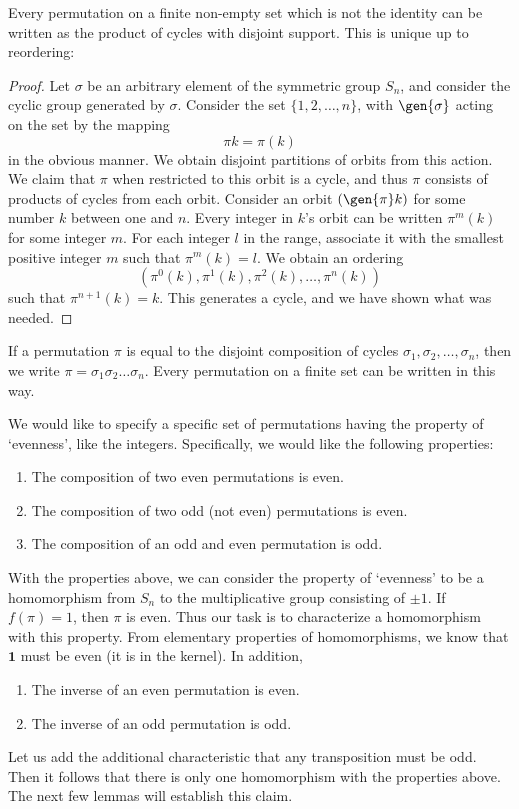 \begin{theorem}
Every permutation on a finite non-empty set which is not the identity can be written as the product of cycles with disjoint support. This is unique up to reordering:
\end{theorem}
\begin{proof}
    Let $\sigma$ be an arbitrary element of the symmetric group $S_n$, and consider the cyclic group generated by $\sigma$. Consider the set $\{ 1, 2, \dots, n \}$, with $\gen{\sigma}$ acting on the set by the mapping
    \[ \pi k = \pi(k) \]
    in the obvious manner. We obtain disjoint partitions of orbits from this action. We claim that $\pi$ when restricted to this orbit is a cycle, and thus $\pi$ consists of products of cycles from each orbit. Consider an orbit $(\gen{\pi} k)$ for some number $k$ between one and $n$. Every integer in $k$'s orbit can be written $\pi^m(k)$ for some integer $m$. For each integer $l$ in the range, associate it with the smallest positive integer $m$ such that $\pi^m(k) = l$. We obtain an ordering
    \[ (\pi^0(k), \pi^1(k), \pi^2(k), \dots, \pi^n(k)) \]
    such that $\pi^{n+1}(k) = k$. This generates a cycle, and we have shown what was needed.
\end{proof}

If a permutation $\pi$ is equal to the disjoint composition of cycles $\sigma_1, \sigma_2, \dots, \sigma_n$, then we write $\pi = \sigma_1\sigma_2\dots\sigma_n$. Every permutation on a finite set can be written in this way.

We would like to specify a specific set of permutations having the property of `evenness', like the integers. Specifically, we would like the following properties:
%
\begin{enumerate}
    \item The composition of two even permutations is even.
    \item The composition of two odd (not even) permutations is even.
    \item The composition of an odd and even permutation is odd.
\end{enumerate}
%
With the properties above, we can consider the property of `evenness' to be a homomorphism from $S_n$ to the multiplicative group consisting of $\pm 1$. If $f(\pi) = 1$, then $\pi$ is even. Thus our task is to characterize a homomorphism with this property. From elementary properties of homomorphisms, we know that $\mathbf{1}$ must be even (it is in the kernel). In addition,
%
\begin{enumerate}
    \item The inverse of an even permutation is even.
    \item The inverse of an odd permutation is odd.
\end{enumerate}
%
Let us add the additional characteristic that any transposition must be odd. Then it follows that there is only one homomorphism with the properties above. The next few lemmas will establish this claim.

